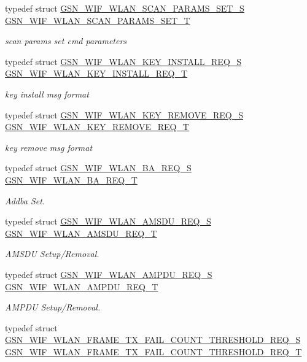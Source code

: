 \begin{DoxyCompactItemize}
typedef struct \hyperlink{a00401}{GSN\_\-WIF\_\-WLAN\_\-SCAN\_\-PARAMS\_\-SET\_\-S} \hyperlink{a00677_ga38fb363f219070729c31798116e9702c}{GSN\_\-WIF\_\-WLAN\_\-SCAN\_\-PARAMS\_\-SET\_\-T}
\begin{DoxyCompactList}\small\item\em scan params set cmd parameters \end{DoxyCompactList}\item 
typedef struct \hyperlink{a00386}{GSN\_\-WIF\_\-WLAN\_\-KEY\_\-INSTALL\_\-REQ\_\-S} \hyperlink{a00677_gaf02b17f4ae1181f48eafc5cafc75a98b}{GSN\_\-WIF\_\-WLAN\_\-KEY\_\-INSTALL\_\-REQ\_\-T}
\begin{DoxyCompactList}\small\item\em key install msg format \end{DoxyCompactList}\item 
typedef struct \hyperlink{a00387}{GSN\_\-WIF\_\-WLAN\_\-KEY\_\-REMOVE\_\-REQ\_\-S} \hyperlink{a00677_gab7781e4db5d81b8372ab59ea540b6f04}{GSN\_\-WIF\_\-WLAN\_\-KEY\_\-REMOVE\_\-REQ\_\-T}
\begin{DoxyCompactList}\small\item\em key remove msg format \end{DoxyCompactList}\item 
typedef struct \hyperlink{a00370}{GSN\_\-WIF\_\-WLAN\_\-BA\_\-REQ\_\-S} \hyperlink{a00677_ga9c1f7a4f3662503ec5a924804653ae43}{GSN\_\-WIF\_\-WLAN\_\-BA\_\-REQ\_\-T}
\begin{DoxyCompactList}\small\item\em Addba Set. \end{DoxyCompactList}\item 
typedef struct \hyperlink{a00367}{GSN\_\-WIF\_\-WLAN\_\-AMSDU\_\-REQ\_\-S} \hyperlink{a00677_ga3da66319027a0addea57f579e40c55a6}{GSN\_\-WIF\_\-WLAN\_\-AMSDU\_\-REQ\_\-T}
\begin{DoxyCompactList}\small\item\em AMSDU Setup/Removal. \end{DoxyCompactList}\item 
typedef struct \hyperlink{a00366}{GSN\_\-WIF\_\-WLAN\_\-AMPDU\_\-REQ\_\-S} \hyperlink{a00677_gade98eca1b34b9be5633f39a09c50f1d1}{GSN\_\-WIF\_\-WLAN\_\-AMPDU\_\-REQ\_\-T}
\begin{DoxyCompactList}\small\item\em AMPDU Setup/Removal. \end{DoxyCompactList}\item 
typedef struct \hyperlink{a00381}{GSN\_\-WIF\_\-WLAN\_\-FRAME\_\-TX\_\-FAIL\_\-COUNT\_\-THRESHOLD\_\-REQ\_\-S} \hyperlink{a00677_ga004bcfaf3fdb9825409e0ae35e69a636}{GSN\_\-WIF\_\-WLAN\_\-FRAME\_\-TX\_\-FAIL\_\-COUNT\_\-THRESHOLD\_\-REQ\_\-T}

\end{DoxyCompactItemize}
